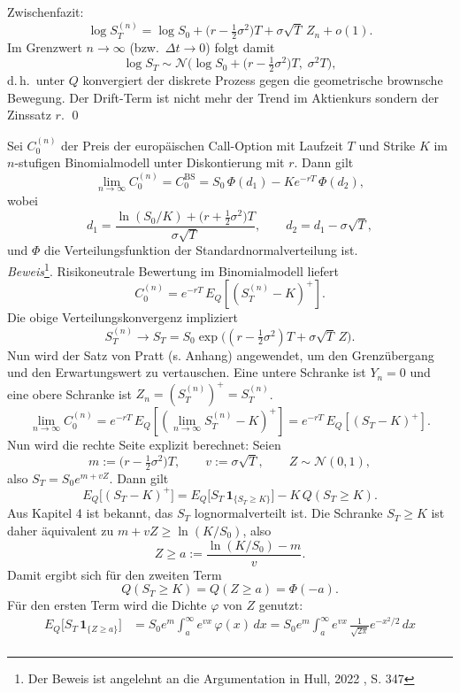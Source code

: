 Zwischenfazit:
$$
\log S_T^{(n)}
= \log S_0 + \big(r - \tfrac12 \sigma^2\big)T + \sigma \sqrt{T}\,Z_n + o(1).
$$
Im Grenzwert $n\to\infty$ (bzw.\ $\Delta t \to 0$) folgt damit
$$
\log S_T \sim \mathcal N\!\Big(\log S_0 + \big(r - \tfrac12 \sigma^2\big)T,\;\sigma^2 T\Big),
$$
d.\,h.\ unter $Q$ konvergiert der diskrete Prozess gegen die geometrische brownsche Bewegung. Der Drift-Term ist nicht mehr der
Trend im Aktienkurs sondern der Zinssatz $r$.
\qed

\begin{satz}
Sei $C_0^{(n)}$ der Preis der europäischen Call-Option mit Laufzeit $T$ und Strike $K$
im $n$-stufigen Binomialmodell unter Diskontierung mit $r$. Dann gilt
$$
\lim_{n\to\infty} C_0^{(n)}
= C_0^{\mathrm{BS}}
= S_0\,\Phi(d_1) - K e^{-rT}\,\Phi(d_2),
$$
wobei
$$
d_1 = \frac{\ln(S_0/K) + \big(r + \tfrac12 \sigma^2\big)T}{\sigma \sqrt{T}},
\qquad
d_2 = d_1 - \sigma \sqrt{T},
$$
und $\Phi$ die Verteilungsfunktion der Standardnormalverteilung ist.
\\ \textit{Beweis}\footnote{Der Beweis ist angelehnt an die Argumentation in Hull, 2022 \cite{hull}, S. 347}. Risikoneutrale Bewertung im Binomialmodell liefert
$$
C_0^{(n)} = e^{-rT}\,E_Q\!\left[(S_T^{(n)} - K)^+\right].
$$
Die obige Verteilungskonvergenz impliziert
$$
S_T^{(n)} \longrightarrow S_T = S_0 \exp\!\big((r-\tfrac12\sigma^2)T + \sigma \sqrt{T}\,Z\big).
$$
Nun wird der Satz von Pratt (s. Anhang) angewendet, um den Grenzübergang und den Erwartungswert zu vertauschen. Eine untere Schranke ist $Y_n=0$ und eine obere Schranke ist $Z_n = (S_T^{(n)})^+ = S_T^{(n)}$. 
$$
\lim_{n\to\infty} C_0^{(n)} = e^{-rT}\,E_Q\!\left[ (\lim_{n\to\infty} S_T^{(n)}-K)^+ \right] = e^{-rT}\,E_Q\!\left[(S_T - K)^+\right].
$$
Nun wird die rechte Seite explizit berechnet: Seien
$$
m := \big(r-\tfrac12\sigma^2\big)T,\qquad v:=\sigma \sqrt{T},\qquad Z\sim \mathcal N(0,1),
$$
also $S_T = S_0 e^{m + v Z}$. Dann gilt
$$
E_Q\big[(S_T - K)^+\big]
= E_Q\big[S_T\,\mathbf 1_{\{S_T\ge K\}}\big] - K\,Q(S_T\ge K).
$$
Aus Kapitel 4 ist bekannt, das $S_T$ lognormalverteilt ist. Die Schranke $S_T\ge K$ ist daher äquivalent zu $m + vZ \ge \ln(K/S_0)$, also
$$
Z \ge a := \frac{\ln(K/S_0) - m}{v}.
$$
Damit ergibt sich für den zweiten Term
$$
Q(S_T\ge K) = Q(Z\ge a) = \Phi(-a).
$$
Für den ersten Term wird die Dichte $\varphi$ von $Z$ genutzt:
$$
\begin{aligned}
E_Q\big[S_T\,\mathbf 1_{\{Z\ge a\}}\big]
&= S_0 e^{m}\int_a^\infty e^{v x}\,\varphi(x)\,dx
= S_0 e^{m}\int_a^\infty e^{v x}\,\frac{1}{\sqrt{2\pi}}e^{-x^2/2}\,dx \\

\end{aligned}$$
\end{satz}
